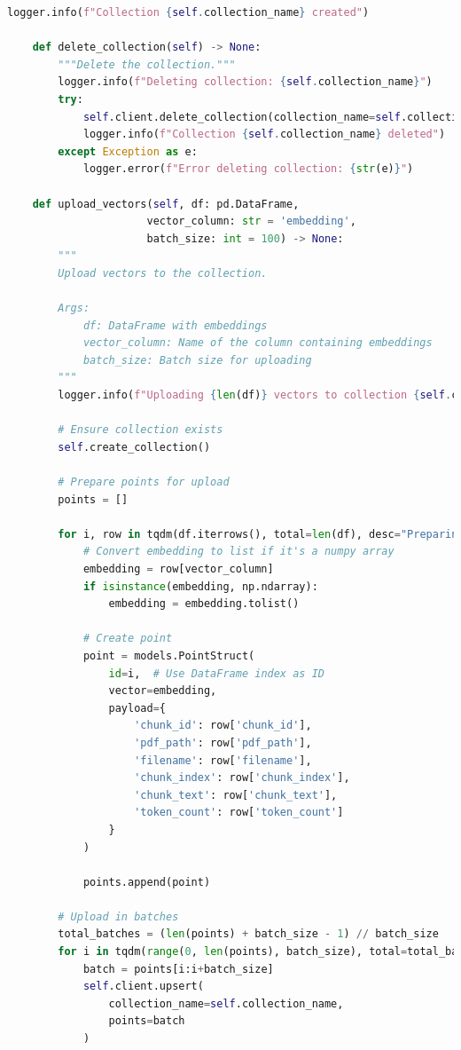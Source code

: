 \documentclass[
  screen,review,acmlarge]{acmart}
\begin{document}
\begin{lstlisting}[language=Python]
        logger.info(f"Collection {self.collection_name} created")
        
    def delete_collection(self) -> None:
        """Delete the collection."""
        logger.info(f"Deleting collection: {self.collection_name}")
        try:
            self.client.delete_collection(collection_name=self.collection_name)
            logger.info(f"Collection {self.collection_name} deleted")
        except Exception as e:
            logger.error(f"Error deleting collection: {str(e)}")
    
    def upload_vectors(self, df: pd.DataFrame, 
                      vector_column: str = 'embedding',
                      batch_size: int = 100) -> None:
        """
        Upload vectors to the collection.
        
        Args:
            df: DataFrame with embeddings
            vector_column: Name of the column containing embeddings
            batch_size: Batch size for uploading
        """
        logger.info(f"Uploading {len(df)} vectors to collection {self.collection_name}")
        
        # Ensure collection exists
        self.create_collection()
        
        # Prepare points for upload
        points = []
        
        for i, row in tqdm(df.iterrows(), total=len(df), desc="Preparing vectors"):
            # Convert embedding to list if it's a numpy array
            embedding = row[vector_column]
            if isinstance(embedding, np.ndarray):
                embedding = embedding.tolist()
            
            # Create point
            point = models.PointStruct(
                id=i,  # Use DataFrame index as ID
                vector=embedding,
                payload={
                    'chunk_id': row['chunk_id'],
                    'pdf_path': row['pdf_path'],
                    'filename': row['filename'],
                    'chunk_index': row['chunk_index'],
                    'chunk_text': row['chunk_text'],
                    'token_count': row['token_count']
                }
            )
            
            points.append(point)
        
        # Upload in batches
        total_batches = (len(points) + batch_size - 1) // batch_size
        for i in tqdm(range(0, len(points), batch_size), total=total_batches, desc="Uploading batches"):
            batch = points[i:i+batch_size]
            self.client.upsert(
                collection_name=self.collection_name,
                points=batch
            )
        

\end{lstlisting}
\end{document}
